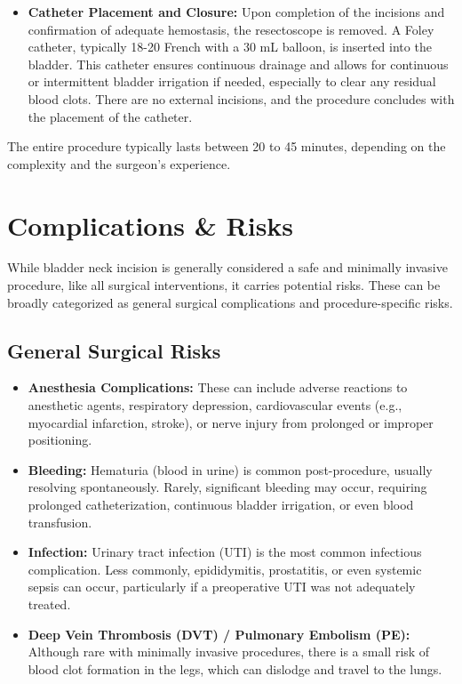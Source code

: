 \begin{itemize}
  \item \textbf{Catheter Placement and Closure:} Upon completion of the incisions and confirmation of adequate hemostasis, the resectoscope is removed. A Foley catheter, typically 18-20 French with a 30 mL balloon, is inserted into the bladder. This catheter ensures continuous drainage and allows for continuous or intermittent bladder irrigation if needed, especially to clear any residual blood clots. There are no external incisions, and the procedure concludes with the placement of the catheter.
\end{itemize}

The entire procedure typically lasts between 20 to 45 minutes, depending on the complexity and the surgeon's experience.

\section*{Complications \& Risks}
While bladder neck incision is generally considered a safe and minimally invasive procedure, like all surgical interventions, it carries potential risks. These can be broadly categorized as general surgical complications and procedure-specific risks.

\subsection*{General Surgical Risks}
\begin{itemize}
  \item \textbf{Anesthesia Complications:} These can include adverse reactions to anesthetic agents, respiratory depression, cardiovascular events (e.g., myocardial infarction, stroke), or nerve injury from prolonged or improper positioning.
  \item \textbf{Bleeding:} Hematuria (blood in urine) is common post-procedure, usually resolving spontaneously. Rarely, significant bleeding may occur, requiring prolonged catheterization, continuous bladder irrigation, or even blood transfusion.
  \item \textbf{Infection:} Urinary tract infection (UTI) is the most common infectious complication. Less commonly, epididymitis, prostatitis, or even systemic sepsis can occur, particularly if a preoperative UTI was not adequately treated.
  \item \textbf{Deep Vein Thrombosis (DVT) / Pulmonary Embolism (PE):} Although rare with minimally invasive procedures, there is a small risk of blood clot formation in the legs, which can dislodge and travel to the lungs.
\end{itemize}

